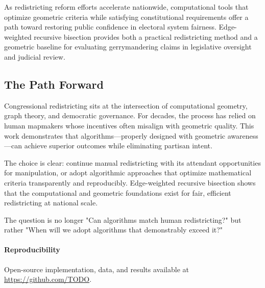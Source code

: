 As redistricting reform efforts accelerate nationwide, computational tools that optimize geometric criteria while satisfying constitutional requirements offer a path toward restoring public confidence in electoral system fairness. Edge-weighted recursive bisection provides both a practical redistricting method and a geometric baseline for evaluating gerrymandering claims in legislative oversight and judicial review.

\subsection{The Path Forward}

Congressional redistricting sits at the intersection of computational geometry, graph theory, and democratic governance. For decades, the process has relied on human mapmakers whose incentives often misalign with geometric quality. This work demonstrates that algorithms—properly designed with geometric awareness—can achieve superior outcomes while eliminating partisan intent.

The choice is clear: continue manual redistricting with its attendant opportunities for manipulation, or adopt algorithmic approaches that optimize mathematical criteria transparently and reproducibly. Edge-weighted recursive bisection shows that the computational and geometric foundations exist for fair, efficient redistricting at national scale.

The question is no longer "Can algorithms match human redistricting?" but rather "When will we adopt algorithms that demonstrably exceed it?"

\paragraph{Reproducibility} Open-source implementation, data, and results available at \url{https://github.com/TODO}.
